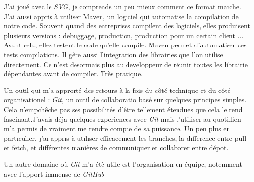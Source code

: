 J'ai joué avec le \textit{SVG}, je comprends un peu mieux comment ce format marche. J'ai aussi appris à utiliser Maven, un logiciel qui automatise la compilation de notre code. Souvent quand des entreprises compilent des logiciels, elles produisent plusieurs versions : debuggage, production, production pour un certain client ... Avant cela, elles testent le code qu'elle compile. Maven permet d'automatiser ces tests compilations. Il gêre aussi l'integration des librairies que l'on utilise directement. Ce n'est desormais plus au developpeur de réunir toutes les librairie dépendantes avant de compiler. Très pratique. 

Un outil qui m'a approrté des retours à la fois du côté technique et du côté organisationel : \textit{Git}, un outil de collaboratio  basé sur quelques principes simples. Cela n'empchêche pas ses possibilités d'être tellement étendues que cela le rend fascinant.J'avais déja quelques experiences avec \textit{Git} mais l'utiliser au quotidien m'a permis de vraiment me rendre compte de sa puissance. Un peu plus en particulier, j'ai appris à utiliser efficacement les branches, la difference entre pull et fetch, et différentes manières de communiquer et collaborer entre dépot.

Un autre domaine où \textit{Git} m'a été utile est l'organisation en équipe, notemment avec l'apport immense de \textit{GitHub}
